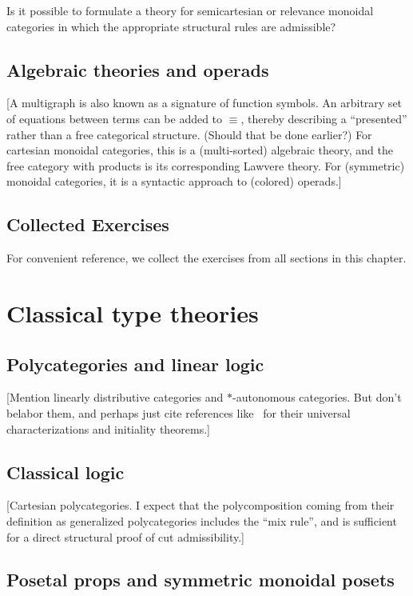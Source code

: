 \documentclass{book}
\def\exaccum{}
\def\ChapterExercises{\section*{Collected Exercises}
  For convenient reference, we collect the exercises from all sections in this chapter.
  \bgroup\def\label##1{}\exaccum\egroup%
  \def\exaccum{}}
\begin{document}
\begin{ex}\label{ex:semicart-relevance-strucadm}
  Is it possible to formulate a theory for semicartesian or relevance monoidal categories in which the appropriate structural rules are admissible?
\end{ex}


\section{Algebraic theories and operads}
\label{sec:algthy-opd}

[A multigraph is also known as a signature of function symbols.
An arbitrary set of equations between terms can be added to $\equiv$, thereby describing a ``presented'' rather than a free categorical structure.
(Should that be done earlier?)
For cartesian monoidal categories, this is a (multi-sorted) algebraic theory, and the free category with products is its corresponding Lawvere theory.
For (symmetric) monoidal categories, it is a syntactic approach to (colored) operads.]


\ChapterExercises


\chapter{Classical type theories}
\label{chap:polycats}


\section{Polycategories and linear logic}
\label{sec:cllin}

[Mention linearly distributive categories and $\ast$-autonomous categories.
But don't belabor them, and perhaps just cite references like~\cite{cs:wkdistrib} for their universal characterizations and initiality theorems.]


\section{Classical logic}
\label{sec:classical}

[Cartesian polycategories.  I expect that the polycomposition coming from their definition as generalized polycategories includes the ``mix rule'', and is sufficient for a direct structural proof of cut admissibility.]


\section{Posetal props and symmetric monoidal posets}
\label{sec:proppos-smpos}
\end{document}

